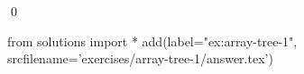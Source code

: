 
\begin{ex} 
  \label{ex:array-tree-1}
  
  \qed
\end{ex} 
\begin{python0}
from solutions import *
add(label="ex:array-tree-1",
    srcfilename='exercises/array-tree-1/answer.tex') 
\end{python0}
